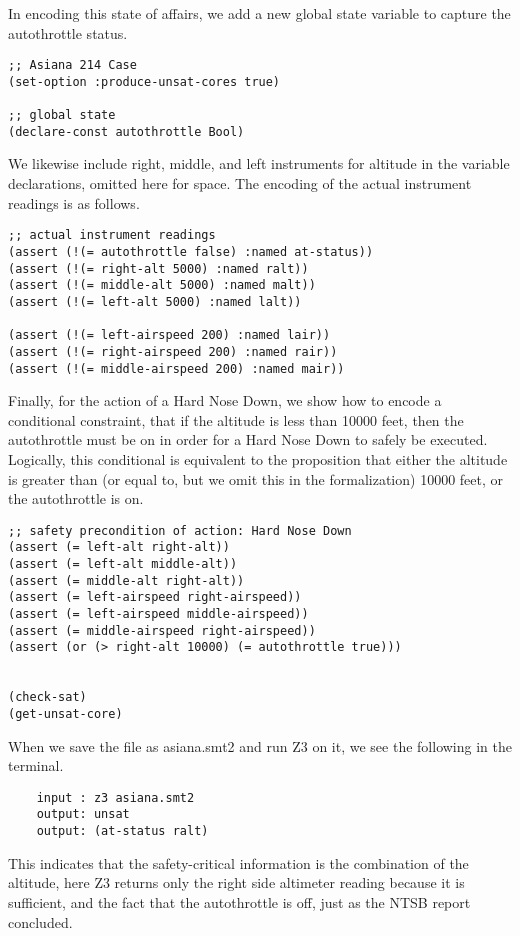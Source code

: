 In encoding this state of affairs, we add a new global state variable to capture the autothrottle status.
\noindent
\begin{tcolorbox}
	\begin{lstlisting}
;; Asiana 214 Case
(set-option :produce-unsat-cores true)
	
;; global state
(declare-const autothrottle Bool)
	\end{lstlisting}
\end{tcolorbox}
\noindent
We likewise include right, middle, and left instruments for altitude in the variable declarations, omitted here for space. The encoding of the actual instrument readings is as follows.
\noindent
\begin{tcolorbox}
	\begin{lstlisting}
;; actual instrument readings
(assert (!(= autothrottle false) :named at-status))
(assert (!(= right-alt 5000) :named ralt))
(assert (!(= middle-alt 5000) :named malt))
(assert (!(= left-alt 5000) :named lalt))

(assert (!(= left-airspeed 200) :named lair))
(assert (!(= right-airspeed 200) :named rair))
(assert (!(= middle-airspeed 200) :named mair))
	\end{lstlisting}
\end{tcolorbox}
\noindent
Finally, for the action of a Hard Nose Down, we show how to encode a conditional constraint, that if the altitude is less than 10000 feet, then the autothrottle must be on in order for a Hard Nose Down to safely be executed. Logically, this conditional is equivalent to the proposition that either the altitude is greater than (or equal to, but we omit this in the formalization) 10000 feet, or the autothrottle is on.
\noindent
\begin{tcolorbox}
	\begin{lstlisting}
;; safety precondition of action: Hard Nose Down
(assert (= left-alt right-alt))
(assert (= left-alt middle-alt))
(assert (= middle-alt right-alt))
(assert (= left-airspeed right-airspeed))
(assert (= left-airspeed middle-airspeed))
(assert (= middle-airspeed right-airspeed))
(assert (or (> right-alt 10000) (= autothrottle true)))


(check-sat)
(get-unsat-core)
	\end{lstlisting}
\end{tcolorbox}
\noindent
When we save the file as asiana.smt2 and run Z3 on it, we see the following in the terminal.
\noindent
\begin{tcolorbox}
	\begin{lstlisting}
	input : z3 asiana.smt2
	output: unsat
	output: (at-status ralt)
	\end{lstlisting}
\end{tcolorbox}
\noindent
This indicates that the safety-critical information is the combination of the altitude, here Z3 returns only the right side altimeter reading because it is sufficient, and the fact that the autothrottle is off, just as the NTSB report concluded.

